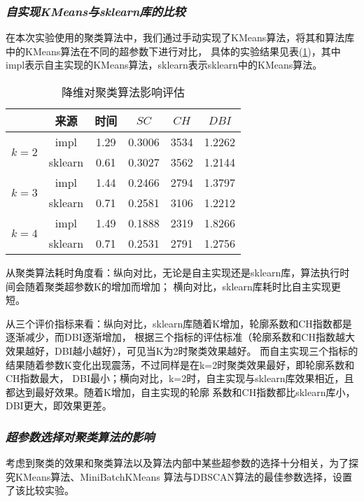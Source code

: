 \documentclass{acm_proc_article-sp}
\begin{document}
\subsubsection{\textit{自实现KMeans与sklearn库的比较}}
在本次实验使用的聚类算法中，我们通过手动实现了KMeans算法，将其和算法库中的KMeans算法在不同的超参数下进行对比，
具体的实验结果见表(\ref{IMPL})，其中impl表示自主实现的KMeans算法，sklearn表示sklearn中的KMeans算法。
\begin{table}[]
\small
\centering
\caption{降维对聚类算法影响评估}
\begin{tabular}{@{}c|c|cccc@{}}
\toprule
                            & 来源        & 时间 & $\mathit{SC}$ & $\mathit{CH}$ & $\mathit{DBI}$ \\ \midrule
\multirow{2}{*}{$k=2$}      & impl        &1.29&0.3006&3534&1.2262\\
                            & sklearn     &0.61&0.3027&3562&1.2144\\ \midrule
\multirow{2}{*}{$k=3$}      & impl        &1.44&0.2466&2794&1.3797\\
                            & sklearn     &0.71&0.2581&3106&1.2212\\ \midrule
\multirow{2}{*}{$k=4$}      & impl        &1.49&0.1888&2319&1.8266\\
                            & sklearn     &0.71&0.2531&2791&1.2756\\ \bottomrule
\end{tabular}
\label{IMPL}
\end{table}
       
从聚类算法耗时角度看：纵向对比，无论是自主实现还是sklearn库，算法执行时间会随着聚类超参数K的增加而增加；
横向对比，sklearn库耗时比自主实现更短。

从三个评价指标来看：纵向对比，sklearn库随着K增加，轮廓系数和CH指数都是逐渐减少，而DBI逐渐增加，
根据三个指标的评估标准（轮廓系数和CH指数越大效果越好，DBI越小越好），可见当K为2时聚类效果越好。
而自主实现三个指标的结果随着参数K变化出现震荡，不过同样是在k=2时聚类效果最好，即轮廓系数和CH指数最大，
DBI最小；横向对比，k=2时，自主实现与sklearn库效果相近，且都达到最好效果。随着K增加，自主实现的轮廓
系数和CH指数都比sklearn库小，DBI更大，即效果更差。

\subsubsection{\textit{超参数选择对聚类算法的影响}}

考虑到聚类的效果和聚类算法以及算法内部中某些超参数的选择十分相关，为了探究KMeans算法、MiniBatchKMeans
算法与DBSCAN算法的最佳参数选择，设置了该比较实验。
\end{document}
